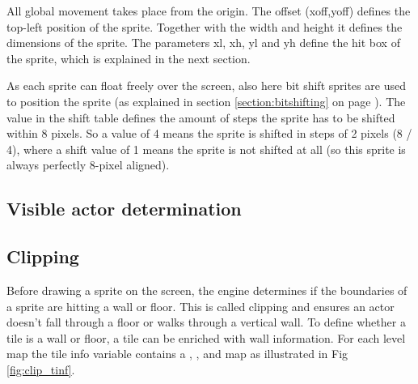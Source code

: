 \documentclass[book.tex]{subfiles}
\begin{document}
All global movement takes place from the origin. The offset (xoff,yoff) defines the top-left position of the sprite. Together with the width and height it defines the dimensions of the sprite. The parameters xl, xh, yl and yh define the hit box of the sprite, which is explained in the next section.\\
\par

As each sprite can float freely over the screen, also here bit shift sprites are used to position the sprite (as explained in section \ref{section:bitshifting} on page \pageref{section:bitshifting}). The value in the shift table defines the amount of steps the sprite has to be shifted within 8 pixels. So a value of 4 means the sprite is shifted in steps of 2 pixels (8 / 4), where a shift value of 1 means the sprite is not shifted at all (so this sprite is always perfectly 8-pixel aligned).\\ 
 

\subsection{Visible actor determination}


\subsection{Clipping}
\label{section:clipping}
Before drawing a sprite on the screen, the engine determines if the boundaries of a sprite are hitting a wall or floor. This is called clipping and ensures an actor doesn't fall through a floor or walks through a vertical wall. To define whether a tile is a wall or floor, a tile can be enriched with wall information. For each level map the tile info variable  contains a , ,  and  map as illustrated in Fig \ref{fig:clip_tinf}.\\
\end{document}
